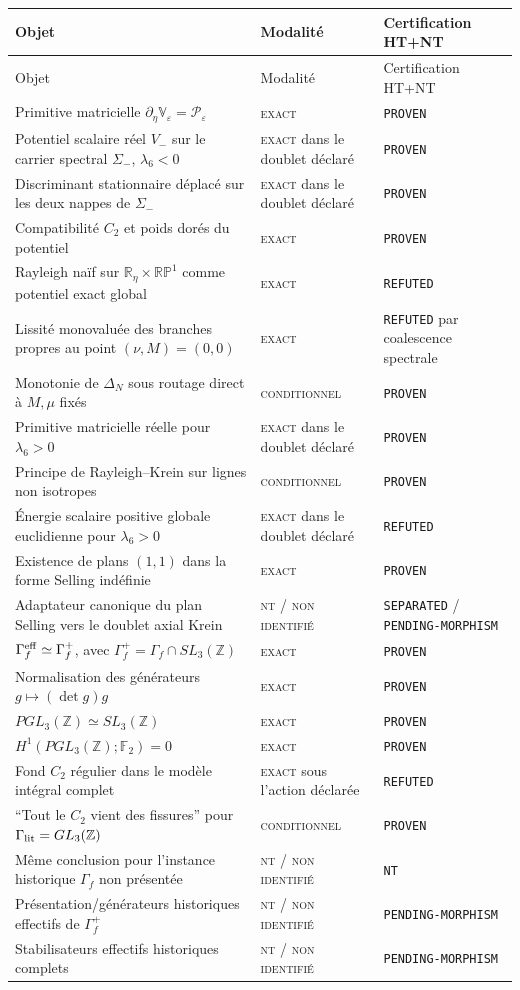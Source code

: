 \documentclass[11pt,a4paper]{article}
\newcommand{\Z}{\mathbb Z}
\newcommand{\statusExact}{\textsc{exact}}
\newcommand{\statusCond}{\textsc{conditionnel}}
\newcommand{\statusNT}{\textsc{nt / non identifié}}
\newcommand{\certProven}{\texttt{PROVEN}}
\newcommand{\certRefuted}{\texttt{REFUTED}}
\newcommand{\certSeparated}{\texttt{SEPARATED}}
\newcommand{\certPending}{\texttt{PENDING-MORPHISM}}
\newcommand{\certNT}{\texttt{NT}}
\begin{document}
\begin{longtable}{@{}p{}p{}p{}@{}}
\toprule
Objet & Modalité & Certification HT+NT \\
\midrule
\endfirsthead
\toprule
Objet & Modalité & Certification HT+NT \\
\midrule
\endhead
Primitive matricielle $\partial_\eta\mathbb V_\varepsilon=\mathcal P_\varepsilon$ & \statusExact & \certProven \\
Potentiel scalaire réel $V_-$ sur le carrier spectral $\Sigma_-$, $\lambda_6<0$ & \statusExact{} dans le doublet déclaré & \certProven \\
Discriminant stationnaire déplacé sur les deux nappes de $\Sigma_-$ & \statusExact{} dans le doublet déclaré & \certProven \\
Compatibilité $C_2$ et poids dorés du potentiel & \statusExact & \certProven \\
Rayleigh naïf sur $\mathbb R_\eta\times\mathbb{RP}^1$ comme potentiel exact global & \statusExact & \certRefuted \\
Lissité monovaluée des branches propres au point $(\nu,M)=(0,0)$ & \statusExact & \certRefuted{} par coalescence spectrale \\
Monotonie de $\Delta_N$ sous routage direct à $M,\mu$ fixés & \statusCond & \certProven \\
Primitive matricielle réelle pour $\lambda_6>0$ & \statusExact{} dans le doublet déclaré & \certProven \\
Principe de Rayleigh--Krein sur lignes non isotropes & \statusCond & \certProven \\
Énergie scalaire positive globale euclidienne pour $\lambda_6>0$ & \statusExact{} dans le doublet déclaré & \certRefuted \\
Existence de plans $(1,1)$ dans la forme Selling indéfinie & \statusExact & \certProven \\
Adaptateur canonique du plan Selling vers le doublet axial Krein & \statusNT & \certSeparated{} / \certPending{} \\
$\Gamma_f^{\rm eff}\simeq\Gamma_f^+$, avec $\Gamma_f^+=\Gamma_f\cap SL_3(\Z)$ & \statusExact & \certProven \\
Normalisation des générateurs $g\mapsto(\det g)g$ & \statusExact & \certProven \\
$PGL_3(\Z)\simeq SL_3(\Z)$ & \statusExact & \certProven \\
$H^1(PGL_3(\Z);\mathbb F_2)=0$ & \statusExact & \certProven \\
Fond $C_2$ régulier dans le modèle intégral complet & \statusExact{} sous l'action déclarée & \certRefuted \\
``Tout le $C_2$ vient des fissures'' pour $\Gamma_{\rm lit}=GL_3(\Z)$ & \statusCond & \certProven \\
Même conclusion pour l'instance historique $\Gamma_f$ non présentée & \statusNT & \certNT \\
Présentation/générateurs historiques effectifs de $\Gamma_f^+$ & \statusNT & \certPending \\
Stabilisateurs effectifs historiques complets & \statusNT & \certPending \\
\bottomrule
\end{longtable}
\end{document}
